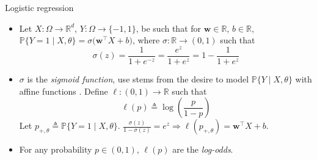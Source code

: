 \documentclass{beamer}
\numberwithin{equation}{section}
\begin{document}
\begin{frame}{Logistic regression}
    \begin{itemize}
        \item
        Let $ X : \Omega \rightarrow \mathbb{R}^d $, $ Y : \Omega \rightarrow
        \{-1, 1\} $, be such that for $ \mathbf{w} \in \mathbb{R} $,
        $ b \in \mathbb{R} $, $ \mathbb{P}\{Y = 1 \mid X, \theta\} =
        \sigma\big(\mathbf{w}^\top X + b\big) $, where $ \sigma : \mathbb{R}
        \rightarrow (0, 1) $ such that
        \begin{equation*}
            \sigma(z) = \frac{1}{1 + e^{-z}} = \frac{e^z}{1 + e^z} =
            1 - \frac{1}{1 + e^z}
        \end{equation*}

        \item
        $ \sigma $ is the \textit{sigmoid function}, use stems from the
        desire to model $ \mathbb{P}\{Y \mid X, \theta\} $ with affine
        functions \cite{esl}. Define $ \ell : (0, 1) \rightarrow \mathbb{R} $
        such that
        \begin{equation*}
            \ell(p) \triangleq \log\left(\frac{p}{1 - p}\right)
        \end{equation*}
        Let $ p_{+, \theta} \triangleq \mathbb{P}\{Y = 1 \mid X, \theta\} $.
        $ \frac{\sigma(z)}{1 - \sigma(z)} = e^z \Rightarrow
        \ell(p_{+, \theta}) = \mathbf{w}^\top X + b $.

        \item
        For any probability $ p \in (0, 1) $, $ \ell(p) $ are the
        \textit{log-odds}.
    \end{itemize}
\end{frame}
\end{document}
